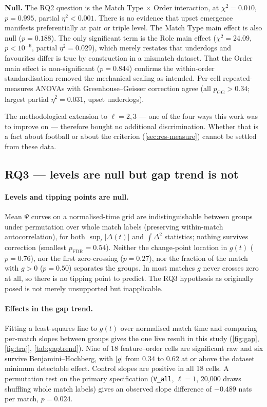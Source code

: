 \documentclass[11pt,a4paper]{article}
\newcommand{\code}[1]{\texttt{\small #1}}
\begin{document}
\textbf{Null.} The RQ2 question is the Match Type $\times$ Order interaction, at
$\chi^2=0.010$, $p=0.995$, partial $\eta^2<0.001$. There is no evidence that upset
emergence manifests preferentially at pair or triple level. The Match Type main effect is
also null ($p=0.188$). The only significant term is the Role main effect
($\chi^2=24.09$, $p<10^{-6}$, partial $\eta^2=0.029$), which merely restates that
underdogs and favourites differ is true by construction in a mismatch dataset. That the
Order main effect is non-significant ($p=0.844$) confirms the within-order standardisation
removed the mechanical scaling as intended. Per-cell repeated-measures ANOVAs with
Greenhouse--Geisser correction agree (all $p_{\text{GG}}>0.34$; largest partial $\eta^2=0.031$,
upset underdogs).

The methodological extension to $\ell=2,3$ --- one of the four ways this work was to
improve on \cite{cheng2025} --- therefore bought no additional discrimination. Whether
that is a fact about football or about the criterion (\cref{sec:res-measure}) cannot be
settled from these data.

\subsection{RQ3 --- levels are null but gap trend is not}
\label{sec:res-rq3}

\paragraph{Levels and tipping points are null.} Mean $\Psi$ curves on a normalised-time grid
are indistinguishable between groups under permutation over whole match labels
(preserving within-match autocorrelation), for both $\sup_t|\Delta(t)|$ and $\int\Delta^2$
statistics; nothing survives correction (smallest $p_{\text{FDR}}=0.54$). Neither the
change-point location in $g(t)$ ($p=0.76$), nor the first zero-crossing ($p=0.27$), nor the
fraction of the match with $g>0$ ($p=0.50$) separates the groups. In most matches $g$ never
crosses zero at all, so there is no tipping point to predict. 
The RQ3 hypothesis as originally posed is not merely unsupported but inapplicable.


\paragraph{Effects in the gap trend.} Fitting a least-squares line to $g(t)$ over
normalised match time and comparing per-match slopes between groups gives the one live
result in this study (\cref{fig:gap}, \cref{fig:traj}, \cref{tab:gaptrend}). Nine of 18
feature--order cells are significant raw and six survive Benjamini--Hochberg, with
$|g|$ from $0.34$ to $0.62$ at or above the dataset minimum detectable effect. Control
slopes are positive in all 18 cells. A permutation test on the primary
specification (\code{V\_all}, $\ell=1$, 20{,}000 draws shuffling whole match labels) gives
an observed slope difference of $-0.489$ nats per match, $p=0.024$.
\end{document}
